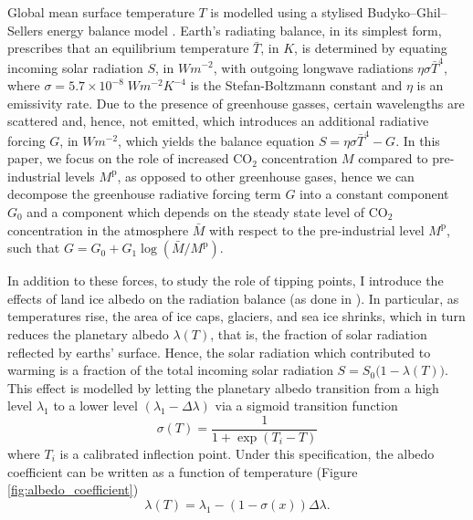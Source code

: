 \documentclass[../../main.tex]{subfiles}
\begin{document}
Global mean surface temperature $T$ is modelled using a stylised Budyko–Ghil–Sellers energy balance model \citep{hogg_glacial_2008, ashwin_extreme_2020}. Earth's radiating balance, in its simplest form, prescribes that an equilibrium temperature $\bar{T}$, in $\unit{K}$, is determined by equating incoming solar radiation $S$, in $\unit{W}\unit{m}^{-2}$, with outgoing longwave radiations $\eta \sigma \bar{T}^4$, where $\sigma = 5.7 \times 10^{-8} \; \unit{W} \unit{m}^{-2} \unit{K}^{-4}$ is the Stefan-Boltzmann constant and $\eta$ is an emissivity rate. Due to the presence of greenhouse gasses, certain wavelengths are scattered and, hence, not emitted, which introduces an additional radiative forcing $G$, in $\unit{W}\unit{m}^{-2}$, which yields the balance equation $S = \eta \sigma \bar{T}^4 - G$. In this paper, we focus on the role of increased CO$_2$ concentration $M$ compared to pre-industrial levels $M^{\mathrm{p}}$, as opposed to other greenhouse gases, hence we can decompose the greenhouse radiative forcing term $G$ into a constant component $G_0$ and a component which depends on the steady state level of CO$_2$ concentration in the atmosphere $\bar{M}$ with respect to the pre-industrial level $M^{\mathrm{p}}$, such that $G = G_0 + G_1 \log(\bar{M} / M^{\mathrm{p}})$.

In addition to these forces, to study the role of tipping points, I introduce the effects of land ice albedo on the radiation balance (as done in \cite{ghil_topics_2011,dijkstra_sensitivity_2015}). In particular, as temperatures rise, the area of ice caps, glaciers, and sea ice shrinks, which in turn reduces the planetary albedo $\lambda(T)$, that is, the fraction of solar radiation reflected by earths' surface. Hence, the solar radiation which contributed to warming is a fraction of the total incoming solar radiation $S = S_0 \big(1 - \lambda(T)\big)$. This effect is modelled by letting the planetary albedo transition from a high level $\lambda_1$ to a lower level $(\lambda_1 - \Delta \lambda)$ via a sigmoid transition function \begin{equation}
    \sigma(T) = \frac{1}{1 + \exp(T_i - T)}
\end{equation} where $T_i$ is a calibrated inflection point. Under this specification, the albedo coefficient can be written as a function of temperature (Figure \ref{fig:albedo_coefficient}) \begin{equation} \label{eq:assumption:albedo}
    \lambda(T) = \lambda_1 - (1 - \sigma(x)) \Delta \lambda.
\end{equation} 
\end{document}
